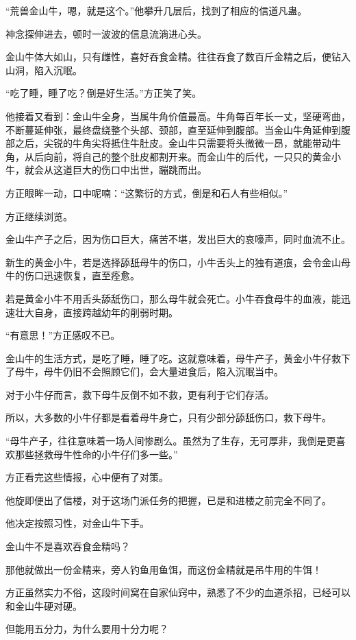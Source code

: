\begin{this_body}
“荒兽金山牛，嗯，就是这个。”他攀升几层后，找到了相应的信道凡蛊。

神念探伸进去，顿时一波波的信息流淌进心头。

金山牛体大如山，只有雌性，喜好吞食金精。往往吞食了数百斤金精之后，便钻入山洞，陷入沉眠。

“吃了睡，睡了吃？倒是好生活。”方正笑了笑。

他接着又看到：金山牛全身，当属牛角价值最高。牛角每百年长一丈，坚硬弯曲，不断蔓延伸张，最终盘绕整个头部、颈部，直至延伸到腹部。当金山牛角延伸到腹部之后，尖锐的牛角尖将抵住牛肚皮。金山牛只需要将头微微一昂，就能带动牛角，从后向前，将自己的整个肚皮都割开来。而金山牛的后代，一只只的黄金小牛，就会从这道巨大的伤口中出世，蹦跳而出。

方正眼眸一动，口中呢喃：“这繁衍的方式，倒是和石人有些相似。”

方正继续浏览。

金山牛产子之后，因为伤口巨大，痛苦不堪，发出巨大的哀嚎声，同时血流不止。

新生的黄金小牛，若是选择舔舐母牛的伤口，小牛舌头上的独有道痕，会令金山母牛的伤口迅速恢复，直至痊愈。

若是黄金小牛不用舌头舔舐伤口，那么母牛就会死亡。小牛吞食母牛的血液，能迅速壮大自身，直接跨越幼年的削弱时期。

“有意思！”方正感叹不已。

金山牛的生活方式，是吃了睡，睡了吃。这就意味着，母牛产子，黄金小牛仔救下了母牛，母牛仍旧不会照顾它们，会大量进食后，陷入沉眠当中。

对于小牛仔而言，救下母牛反倒不如不救，更有利于它们存活。

所以，大多数的小牛仔都是看着母牛身亡，只有少部分舔舐伤口，救下母牛。

“母牛产子，往往意味着一场人间惨剧么。虽然为了生存，无可厚非，我倒是更喜欢那些拯救母牛性命的小牛仔们多一些。”

方正看完这些情报，心中便有了对策。

他旋即便出了信楼，对于这场门派任务的把握，已是和进楼之前完全不同了。

他决定按照习性，对金山牛下手。

金山牛不是喜欢吞食金精吗？

那他就做出一份金精来，旁人钓鱼用鱼饵，而这份金精就是吊牛用的牛饵！

方正虽然实力不俗，这段时间窝在自家仙窍中，熟悉了不少的血道杀招，已经可以和金山牛硬对硬。

但能用五分力，为什么要用十分力呢？


\end{this_body}
